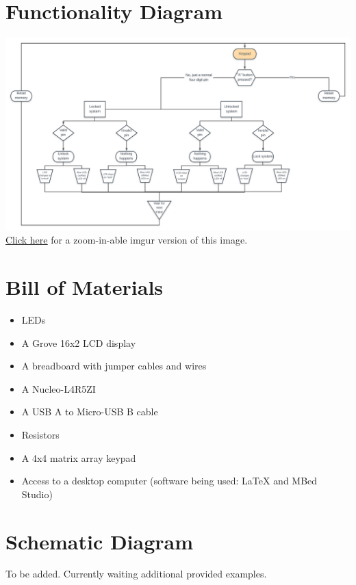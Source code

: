 \documentclass[10pt,a4paper]{article}
\begin{document}
\section{Functionality Diagram}
\includegraphics[width=\linewidth]{Flowchart}\\
\href{https://i.imgur.com/dgIrW47.png}{\underline{Click here}} for a zoom-in-able imgur version of this image.
\pagebreak
\section{Bill of Materials}
\begin{itemize}
	\item LEDs
	\item A Grove 16x2 LCD display
	\item A breadboard with jumper cables and wires
	\item A Nucleo-L4R5ZI
	\item A USB A to Micro-USB B cable
	\item Resistors
	\item A 4x4 matrix array keypad
	\item Access to a desktop computer (software being used: \LaTeX{ }and MBed Studio)
\end{itemize}
\pagebreak
\section{Schematic Diagram}
To be added. Currently waiting additional provided examples.
\pagebreak
\end{document}
